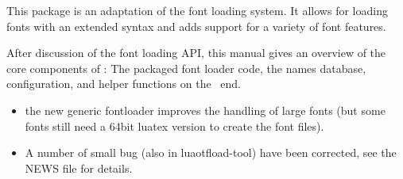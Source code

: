 
\beginfrontmatter


  \typesetdocumenttitle

  \beginabstractcontent
    This package is an adaptation of the \CONTEXT font loading system.
    It allows for loading \OpenType fonts with an extended syntax and adds
    support for a variety of font features.

    After discussion of the font loading API, this manual gives an
    overview of the core components of : The
    packaged font loader code, the names database, configuration, and
    helper functions on the \LUA\ end.
  \endabstractcontent

\endfrontmatter

\typesetcontent
{}
\begin{itemize}
\item the new generic fontloader improves the handling of large fonts (but some fonts still need a 64bit luatex version to create the font files).
\item A number of small bug (also in luaotfload-tool) have been corrected, see the NEWS file for details.

\end{itemize}
\endsection

